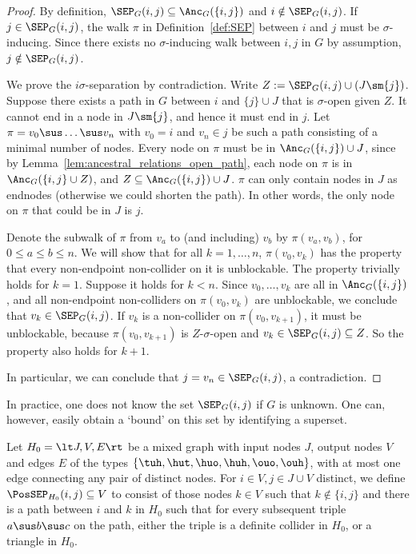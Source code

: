 \begin{proof}
  By definition, $\SEP_G(i,j) \subseteq \Anc_G(\{i,j\})$ and $i \notin \SEP_G(i,j)$.
  If $j \in \SEP_G(i,j)$, the walk $\pi$ in Definition~\ref{def:SEP} between $i$ and $j$ must be $\sigma$-inducing.
  Since there exists no $\sigma$-inducing walk between $i,j$ in $G$ by assumption, $j \notin \SEP_G(i,j)$.

  We prove the $i\sigma$-separation by contradiction.
  Write $Z := \SEP_G(i,j) \cup (J \sm \{j\})$.
  Suppose there exists a path in $G$ between $i$ and $\{j\} \cup J$ that is $\sigma$-open given $Z$.
  It cannot end in a node in $J \sm \{j\}$, and hence it must end in $j$.
  Let $\pi = v_0 \sus \dots \sus v_n$ with $v_0 = i$ and $v_n \in j$ be such a path consisting of a minimal number of nodes.
  Every node on $\pi$ must be in $\Anc_G(\{i,j\}) \cup J$, since by Lemma~\ref{lem:ancestral_relations_open_path}, each node on $\pi$ is in $\Anc_G(\{i,j\} \cup Z)$, and $Z \subseteq \Anc_G(\{i,j\}) \cup J$.
  $\pi$ can only contain nodes in $J$ as endnodes (otherwise we could shorten the path).
  In other words, the only node on $\pi$ that could be in $J$ is $j$.

  Denote the subwalk of $\pi$ from $v_a$ to (and including) $v_b$ by $\pi(v_a,v_b)$, for $0 \le a \le b \le n$.
  We will show that for all $k = 1,\dots,n$, $\pi(v_0,v_k)$ has the property that every non-endpoint non-collider on it is unblockable.
  The property trivially holds for $k=1$. 
  Suppose it holds for $k < n$.
  Since $v_0,\dots,v_k$ are all in $\Anc_G(\{i,j\})$, and all non-endpoint non-colliders on $\pi(v_0,v_k)$ are unblockable, we conclude that $v_k \in \SEP_G(i,j)$.
  If $v_{k}$ is a non-collider on $\pi(v_0,v_{k+1})$, it must be unblockable, because $\pi(v_0,v_{k+1})$ is $Z$-$\sigma$-open and $v_k \in \SEP_G(i,j) \subseteq Z$.
  So the property also holds for $k+1$.

  In particular, we can conclude that $j = v_n \in \SEP_G(i,j)$, a contradiction.
\end{proof}
In practice, one does not know the set $\SEP_G(i,j)$ if $G$ is unknown.
One can, however, easily obtain a `bound' on this set by identifying a superset.
\begin{Def}\label{def:possep}
  Let $H_0 = \lt J,V,E\rt$ be a mixed graph with input nodes $J$, output nodes $V$ and edges $E$ of the types $\{\tuh,\hut,\huo,\huh,\ouo,\ouh\}$, with at most one edge connecting any pair of distinct nodes.
  For $i \in V, j \in J \cup V$ distinct, we define $\PosSEP_{H_0}(i,j) \subseteq V$ to consist of those nodes
  $k \in V$ such that $k \not\in \{i,j\}$ and there is a path between $i$ and $k$ in $H_0$ such that for
  every subsequent triple $a \sus b \sus c$ on the path, either the triple is a definite collider in $H_0$,
  or a triangle in $H_0$.
\end{Def}
